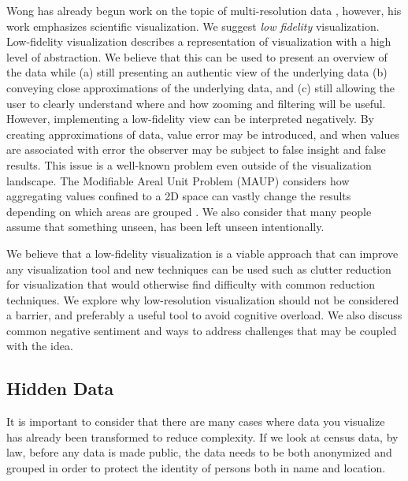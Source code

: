 Wong has already begun work on the topic of multi-resolution data \cite{wong1997adaptive}, however, his work emphasizes scientific visualization. We suggest \textit{low fidelity} visualization. Low-fidelity visualization describes a representation of visualization with a high level of abstraction. We believe that this can be used to present an overview of the data while (a) still presenting an authentic view of the underlying data (b) conveying close approximations of the underlying data, and (c) still allowing the user to clearly understand where and how zooming and filtering will be useful. However, implementing a low-fidelity view can be interpreted negatively. By creating approximations of data, value error may be introduced, and when values are associated with error the observer may be subject to false insight and false results. This issue is a well-known problem even outside of the visualization landscape. The Modifiable Areal Unit Problem (MAUP) considers how aggregating values confined to a 2D space can vastly change the results depending on which areas are grouped \cite{openshaw1984modifiable}.
We also consider that many people assume that something unseen, has been left unseen intentionally.

We believe that a low-fidelity visualization is a viable approach that can improve any visualization tool and new techniques can be used such as clutter reduction for visualization that would otherwise find difficulty with common reduction techniques.  We explore why low-resolution visualization should not be considered a barrier, and preferably a useful tool to avoid cognitive overload. We also discuss common negative sentiment and ways to address challenges that may be coupled with the idea.

\subsection{Hidden Data}
It is important to consider that there are many cases where data you visualize has already been transformed to reduce complexity. If we look at census data, by law, before any data is made public, the data needs to be both anonymized and grouped in order to protect the identity of persons both in name and location. %

